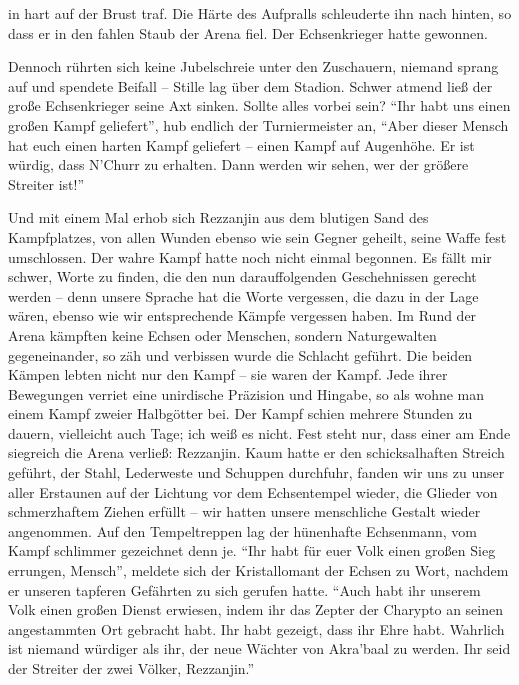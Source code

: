 in hart auf der Brust traf. Die Härte des Aufpralls schleuderte ihn nach hinten, so dass er in den fahlen Staub der Arena fiel. Der Echsenkrieger hatte gewonnen.

Dennoch rührten sich keine Jubelschreie unter den Zuschauern, niemand sprang auf und spendete Beifall -- Stille lag über dem Stadion. Schwer atmend ließ der große Echsenkrieger seine Axt sinken. Sollte alles vorbei sein? ``Ihr habt uns einen großen Kampf geliefert'', hub endlich der Turniermeister an, ``Aber dieser Mensch hat euch einen harten Kampf geliefert -- einen Kampf auf Augenhöhe. Er ist würdig, dass N'Churr zu erhalten. Dann werden wir sehen, wer der größere Streiter ist!''

Und mit einem Mal erhob sich Rezzanjin aus dem blutigen Sand des Kampfplatzes, von allen Wunden ebenso wie sein Gegner geheilt, seine Waffe fest umschlossen. Der wahre Kampf hatte noch nicht einmal begonnen. Es fällt mir schwer, Worte zu finden, die den nun darauffolgenden Geschehnissen gerecht werden -- denn unsere Sprache hat die Worte vergessen, die dazu in der Lage wären, ebenso wie wir entsprechende Kämpfe vergessen haben. Im Rund der Arena kämpften keine Echsen oder Menschen, sondern Naturgewalten gegeneinander, so zäh und verbissen wurde die Schlacht geführt. Die beiden Kämpen lebten nicht nur den Kampf -- sie waren der Kampf. Jede ihrer Bewegungen verriet eine unirdische Präzision und Hingabe, so als wohne man einem Kampf zweier Halbgötter bei. Der Kampf schien mehrere Stunden zu dauern, vielleicht auch Tage; ich weiß es nicht. Fest steht nur, dass einer am Ende siegreich die Arena verließ: Rezzanjin. Kaum hatte er den schicksalhaften Streich geführt, der Stahl, Lederweste und Schuppen durchfuhr, fanden wir uns zu unser aller Erstaunen auf der Lichtung vor dem Echsentempel wieder, die Glieder von schmerzhaftem Ziehen erfüllt -- wir hatten unsere menschliche Gestalt wieder angenommen. Auf den Tempeltreppen lag der hünenhafte Echsenmann, vom Kampf schlimmer gezeichnet denn je. ``Ihr habt für euer Volk einen großen Sieg errungen, Mensch'', meldete sich der Kristallomant der Echsen zu Wort, nachdem er unseren tapferen Gefährten zu sich gerufen hatte. ``Auch habt ihr unserem Volk einen großen Dienst erwiesen, indem ihr das Zepter der Charypto an seinen angestammten Ort gebracht habt. Ihr habt gezeigt, dass ihr Ehre habt. Wahrlich ist niemand würdiger als ihr, der neue Wächter von Akra'baal zu werden. Ihr seid der Streiter der zwei Völker, Rezzanjin.''

